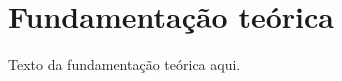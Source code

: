 \section{Fundamentação teórica}
\label{sec:fundamentacao_teorica}

Texto da fundamentação teórica aqui.

